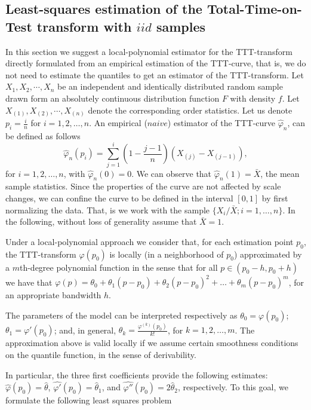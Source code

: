 \documentclass[preprint,12pt]{elsarticle}
\begin{document}
\subsection{Least-squares estimation of the Total-Time-on-Test transform with $iid$ samples} 
In this section we suggest a local-polynomial estimator for the TTT-transform directly formulated from an empirical estimation of the TTT-curve, that is, we do not need to estimate the quantiles to get an estimator of the TTT-transform.
%
\noindent Let $X_1,X_2,\cdots,X_n$ be an independent and identically distributed random sample drawn form an absolutely continuous distribution function $F$ with density $f$. Let $X_{(1)},X_{(2)},\cdots,X_{(n)}$ denote the corresponding order statistics. Let us denote $p_i=\frac{i}{n}$ for $i= 1,2, \ldots, n$. An empirical ($naive$) estimator of the TTT-curve $\widehat{\varphi}_n$, can be defined as follows
%
\begin{equation}\label{empi}
\widehat{\varphi}_n\left(p_i\right)= \sum_{j=1}^i \left(1-\frac{j-1}{n}\right) \left(X_{(j)}-X_{(j-1)}\right),
\end{equation}
for $i=1,2,\ldots,n$, with $\widehat{\varphi}_n(0)=0$. We can observe that $\widehat{\varphi}_n(1)=\bar{X}$, the mean sample statistics. Since the properties of the curve are not affected by scale changes, we can confine the curve to be defined in the interval $[0,1]$ by first normalizing the data. That, is we work with the sample $\{X_i/\bar{X}; i=1,\ldots,n\}$. In the following, without loss of generality assume that $\bar{X}=1$.

Under a local-polynomial approach we consider that, for each estimation point $p_0$, the TTT-transform $\varphi(p_0)$ is locally (in a neighborhood of $p_0$) approximated by a $m$th-degree polynomial function in the sense that for all $p \in \left(p_0-h,p_0+h\right)$ we have that $\varphi(p)=\theta_0+\theta_1(p-p_0)+\theta_2(p-p_0)^2+\ldots+\theta_m(p-p_0)^m$, for an appropriate bandwidth $h$. 

The parameters of the model can be interpreted respectively as $\theta_0={\varphi}(p_0)$; ${\theta}_1={\varphi'}(p_0)$; and, in general, ${\theta}_k=\frac{\varphi^{(k)}(p_0)}{k!}$, for $k=1,2,\ldots,m$. The approximation above is valid locally if we assume certain smoothness conditions on the quantile function, in the sense of derivability. 


In particular, the three first coefficients provide the following estimates: $\widehat{\varphi}(p_0)=\widehat{\theta}$, $\widehat{\varphi'}(p_0)=\widehat{\theta}_1$, and $\widehat{\varphi''}(p_0)=2\widehat{\theta}_2$, respectively.
To this goal, we formulate the following least squares problem
\end{document}
